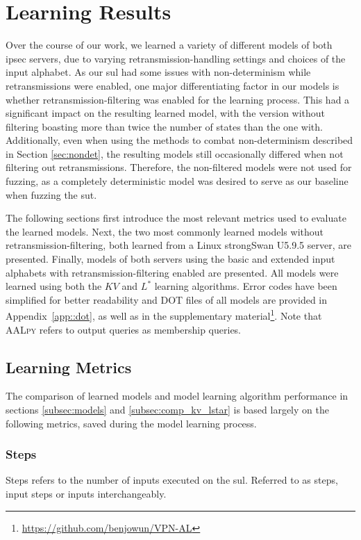 \section{Learning Results} \label{sec:learnresults}
Over the course of our work, we learned a variety of different models of both \ac{ipsec} servers, due to varying retransmission-handling settings and choices of the input alphabet. As our \ac{sul} had some issues with non-determinism while retransmissions were enabled, one major differentiating factor in our models is whether retransmission-filtering was enabled for the learning process. This had a significant impact on the resulting learned model, with the version without filtering boasting more than twice the number of states than the one with. Additionally, even when using the methods to combat non-determinism described in Section \ref{sec:nondet}, the resulting models still occasionally differed when not filtering out retransmissions. Therefore, the non-filtered models were not used for fuzzing, as a completely deterministic model was desired to serve as our baseline when fuzzing the \ac{sut}.

The following sections first introduce the most relevant metrics used to evaluate the learned models. Next, the two most commonly learned models without retransmission-filtering, both learned from a Linux strongSwan U5.9.5 server, are presented. Finally, models of both servers using the basic and extended input alphabets with retransmission-filtering enabled are presented. All models were learned using both the $KV$ and $L^*$ learning algorithms. Error codes have been simplified for better readability and DOT files of all models are provided in Appendix~\ref{app::dot}, as well as in the supplementary material\footnote{\url{https://github.com/benjowun/VPN-AL}}. Note that \textsc{AALpy} refers to output queries as membership queries.

\newpage

\subsection{Learning Metrics} \label{subsec:metrics}
The comparison of learned models and model learning algorithm performance in sections \ref{subsec:models} and \ref{subsec:comp_kv_lstar} is based largely on the following metrics, saved during the model learning process.

\subsubsection*{Steps}
Steps refers to the number of inputs executed on the \ac{sul}. Referred to as steps, input steps or inputs interchangeably.

